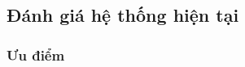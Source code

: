 
\FloatBarrier
\subsection*{Đánh giá hệ thống hiện tại}
\label{subsec:ks-danhgia}

\subsubsection*{Ưu điểm}

